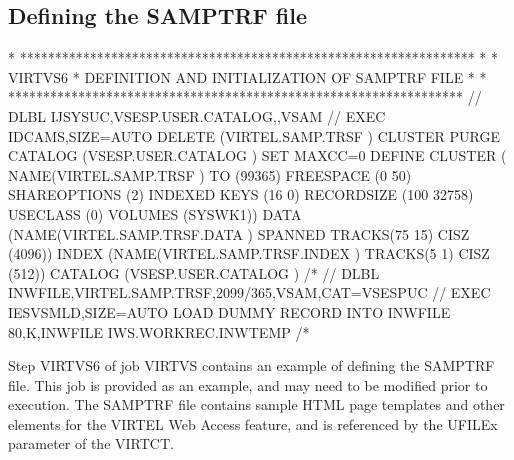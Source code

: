 \documentclass[letterpaper,10pt,english]{sphinxmanual}
\begin{document}
\subsection{Defining the SAMPTRF file}
\label{\detokenize{Installation_Guide:defining-the-samptrf-file}}
\begin{sphinxVerbatim}[commandchars=\\\{\}]
* *****************************************************************
* * VIRTVS6 * DEFINITION AND INITIALIZATION OF SAMPTRF FILE *
* *****************************************************************
// DLBL IJSYSUC,\PYGZsq{}VSESP.USER.CATALOG\PYGZsq{},,VSAM
// EXEC IDCAMS,SIZE=AUTO
  DELETE (VIRTEL.SAMP.TRSF ) \PYGZhy{}
    CLUSTER \PYGZhy{}
    PURGE \PYGZhy{}
    CATALOG (VSESP.USER.CATALOG )
  SET MAXCC=0
  DEFINE CLUSTER ( \PYGZhy{}
    NAME(VIRTEL.SAMP.TRSF ) \PYGZhy{}
    TO (99365) \PYGZhy{}
    FREESPACE (0 50) \PYGZhy{}
    SHAREOPTIONS (2) \PYGZhy{}
    INDEXED \PYGZhy{}
    KEYS (16 0) \PYGZhy{}
    RECORDSIZE (100 32758) \PYGZhy{}
    USECLASS (0) \PYGZhy{}
    VOLUMES (SYSWK1)) \PYGZhy{}
  DATA (NAME(VIRTEL.SAMP.TRSF.DATA ) \PYGZhy{}
    SPANNED \PYGZhy{}
    TRACKS(75 15) \textendash{}
    CISZ (4096)) \PYGZhy{}
  INDEX (NAME(VIRTEL.SAMP.TRSF.INDEX ) \PYGZhy{}
    TRACKS(5 1) \textendash{}
    CISZ (512)) \PYGZhy{}
  CATALOG (VSESP.USER.CATALOG )
/*
// DLBL INWFILE,\PYGZsq{}VIRTEL.SAMP.TRSF\PYGZsq{},2099/365,VSAM,CAT=VSESPUC
// EXEC IESVSMLD,SIZE=AUTO LOAD DUMMY RECORD INTO INWFILE
80,K,INWFILE
\PYGZdl{}\PYGZdl{}\PYGZdl{}\PYGZdl{}IWS.WORKREC.INW\PYGZdl{}TEMP
/*
\end{sphinxVerbatim}


Step VIRTVS6 of job VIRTVS contains an example of defining the SAMPTRF file. This job is provided as an example, and may need to be modified prior to execution. The SAMPTRF file contains sample HTML page templates and other elements for the VIRTEL Web Access feature, and is referenced by the UFILEx parameter of the VIRTCT.
\end{document}
